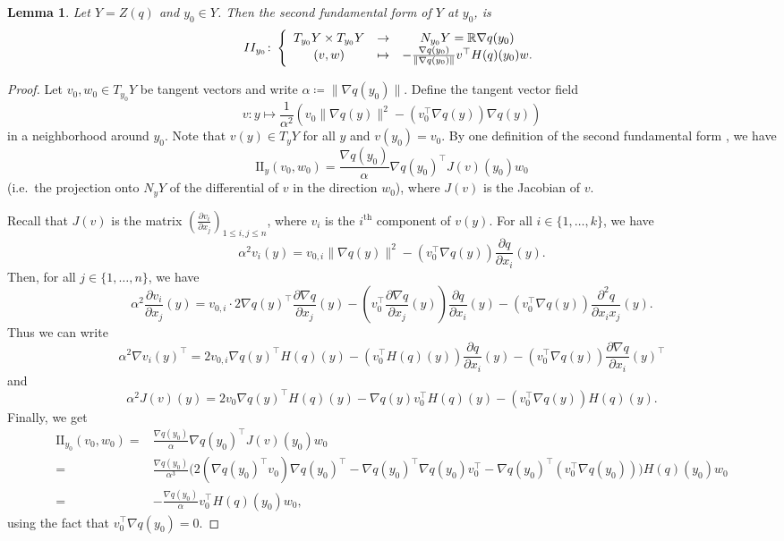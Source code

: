 \documentclass{amsart}
\newcommand{\R}{\mathbb{R}}
\newtheorem{lemma}[subsubsection]{Lemma}
\theoremstyle{definition}
\theoremstyle{remark}
\begin{document}
\begin{lemma}
\label{L:II}
Let $Y = Z(q)$ and $y_0 \in Y$. Then the second fundamental form of $Y$ at $y_0$, is
\[
\textnormal{II}_{y_0} \colon \left\{ \begin{array}{ccc}
T_{y_0} Y \times T_{y_0} Y & \to & N_{y_0} Y = \R \nabla q(y_0) \\
(v, w) & \mapsto & -\frac{\nabla q(y_0)}{\| \nabla q(y_0) \|} v^\top H(q)(y_0) w.
\end{array} \right.
\]
\end{lemma}
\begin{proof}
Let $v_0, w_0 \in T_{y_0} Y$ be tangent vectors and write $\alpha \coloneqq \| \nabla q(y_0) \|$. Define the tangent vector field
\[
v \colon y \mapsto \frac{1}{\alpha^2}\left(v_0 \| \nabla q(y) \|^2 - (v_0^\top \nabla q(y)) \nabla q(y)\right)
\]
in a neighborhood around $y_0$. Note that $v(y) \in T_y Y$ for all $y$ and $v(y_0) = v_0$. By one definition of the second fundamental form \cite[Chapter 8]{Lee1997}, we have 
\[
\text{II}_y(v_0, w_0) = \frac{\nabla q(y_0)}{\alpha} \nabla q(y_0)^\top J(v)(y_0) w_0
\]
(i.e.\ the projection onto $N_y Y$ of the differential of $v$ in the direction $w_0$), where $J(v)$ is the Jacobian of $v$.

Recall that $J(v)$ is the matrix $(\frac{\partial v_i}{\partial x_j})_{1 \leq i, j \leq n}$, where $v_i$ is the $i^{\text{th}}$ component of $v(y)$. For all $i \in \{1, \ldots, k\}$, we have
\[
\alpha^2 v_i(y) = v_{0, i} \| \nabla q(y) \|^2 - (v_0^\top \nabla q(y)) \frac{\partial q}{\partial x_i}(y).
\]
Then, for all $j \in \{1, \ldots, n\}$, we have
\[
\alpha^2 \frac{\partial v_i}{\partial x_j}(y) = v_{0, i} \cdot 2 \nabla q(y)^\top \frac{\partial \nabla q}{\partial x_j}(y) - \left(v_0^\top \frac{\partial \nabla q}{\partial x_j}(y)\right) \frac{\partial q}{\partial x_i}(y) - (v_0^\top \nabla q(y)) \frac{\partial^2 q}{\partial x_i x_j}(y).
\]
Thus we can write
\[
\alpha^2 \nabla v_i (y)^\top = 2 v_{0, i} \nabla q(y)^\top H(q)(y) - (v_0^\top H(q)(y)) \frac{\partial q}{\partial x_i}(y) - (v_0^\top \nabla q(y)) \frac{\partial \nabla q}{\partial x_i}(y)^\top
\]
and
\[
\alpha^2 J(v)(y) = 2 v_0 \nabla q(y)^\top H(q)(y) - \nabla q(y) v_0^\top H(q)(y) - (v_0^\top \nabla q(y)) H(q)(y).
\]
Finally, we get
\begin{align}
\text{II}_{y_0}(v_0, w_0) = {} & \frac{\nabla q(y_0)}{\alpha} \nabla q(y_0)^\top J(v)(y_0) w_0 \\
= {} & \frac{\nabla q(y_0)}{\alpha^3} \Big( 2(\nabla q(y_0)^\top v_0) \nabla q(y_0)^\top - \nabla q(y_0)^\top \nabla q(y_0) v_0^\top - \nabla q(y_0)^\top (v_0^\top \nabla q(y_0)) \Big) H(q)(y_0) w_0 \\
= {} & -\frac{\nabla q(y_0)}{\alpha} v_0^\top H(q)(y_0) w_0,
\end{align}
using the fact that $v_0^\top \nabla q(y_0) = 0$.
\end{proof}
\end{document}
